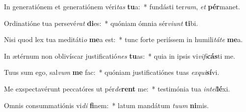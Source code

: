 \item In generatiónem et generatiónem véri\textit{tas} \textbf{tu}a:~* fundásti ter\textit{ram}, \textit{et} \textbf{pér}manet.
\item Ordinatióne tua persevé\textit{rat} \textbf{di}es:~* quóniam ómnia sér\textit{vi}\textit{unt} \textbf{ti}bi.
\item Nisi quod lex tua meditáti\textit{o} \textbf{me}a est:~* tunc forte periíssem in humili\textit{tá}\textit{te} \textbf{me}a.
\item In ætérnum non oblivíscar justificatió\textit{nes} \textbf{tu}as:~* quia in ipsis vi\textit{vi}\textit{fi}\textbf{cás}ti me.
\item Tuus sum ego, sal\textit{vum} \textbf{me} fac:~* quóniam justificatiónes tuas \textit{ex}\textit{qui}\textbf{sí}vi.
\item Me exspectavérunt peccatóres ut pér\textit{de}\textbf{rent} me:~* testimónia tua \textit{in}\textit{tel}\textbf{lé}xi.
\item Omnis consummatiónis vi\textit{di} \textbf{fi}nem:~* latum mandátum \textit{tu}\textit{um} \textbf{ni}mis.
